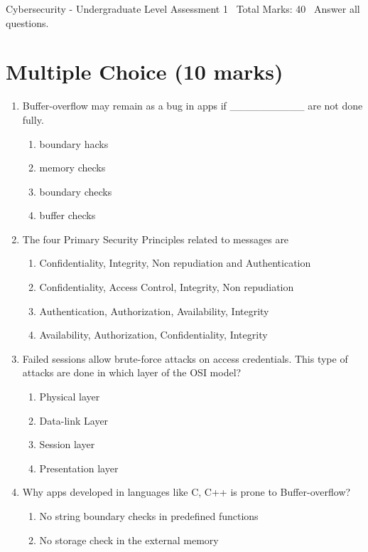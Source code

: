 \documentclass[12pt]{article}
\begin{document}
\begin{center}
Cybersecurity - Undergraduate Level Assessment 1 \
Total Marks: 40 \
Answer all questions.
\end{center}

\section*{Multiple Choice (10 marks)}
\begin{enumerate}[label=\arabic*.]
\item Buffer-overflow may remain as a bug in apps if \_\_\_\_\_\_\_\_\_\_ are not done fully.
\begin{enumerate}[label=(\alph*)]
    \item boundary hacks
    \item memory checks
    \item boundary checks
    \item buffer checks
\end{enumerate}
\item The four Primary Security Principles related to messages are
\begin{enumerate}[label=(\alph*)]
    \item Confidentiality, Integrity, Non repudiation and Authentication
    \item Confidentiality, Access Control, Integrity, Non repudiation
    \item Authentication, Authorization, Availability, Integrity
    \item Availability, Authorization, Confidentiality, Integrity
\end{enumerate}
\item Failed sessions allow brute-force attacks on access credentials. This type of attacks are done in which layer of the OSI model?
\begin{enumerate}[label=(\alph*)]
    \item Physical layer
    \item Data-link Layer
    \item Session layer
    \item Presentation layer
\end{enumerate}
\item Why apps developed in languages like C, C++ is prone to Buffer-overflow?
\begin{enumerate}[label=(\alph*)]
    \item No string boundary checks in predefined functions
    \item No storage check in the external memory

\end{enumerate}
\end{enumerate}
\end{document}
